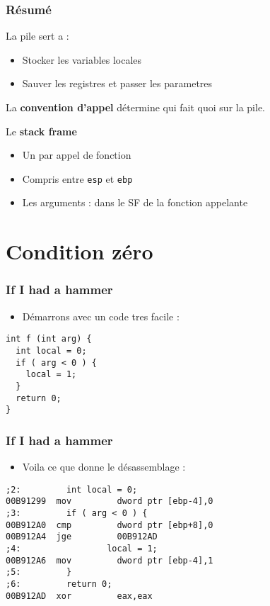 \documentclass{beamer}
\begin{document}
\begin{frame}[fragile]
\frametitle{Résumé}
La pile sert a :
\begin{itemize}
\item Stocker les variables locales
\item Sauver les registres et passer les parametres
\end{itemize}
La \textbf{convention d'appel} détermine qui fait quoi sur la pile.

Le \textbf{stack frame}
\begin{itemize}
\item Un par appel de fonction
\item Compris entre \texttt{esp} et \texttt{ebp}
\item Les arguments : dans le SF de la fonction appelante
\end{itemize}

\end{frame}

\section{Condition zéro}
\begin{frame}[fragile]
\frametitle{If I had a hammer}
\begin{itemize}
\item Démarrons avec un code tres facile :
\end{itemize}
\begin{lstlisting}
int f (int arg) {
  int local = 0;
  if ( arg < 0 ) {
    local = 1;
  }
  return 0;
}
\end{lstlisting}
\end{frame}

\begin{frame}[fragile]
\frametitle{If I had a hammer}
\begin{itemize}
\item Voila ce que donne le désassemblage : 
\end{itemize}
\begin{lstlisting}[language={[x86masm]Assembler}]
;2:         int local = 0;
00B91299  mov         dword ptr [ebp-4],0  
;3:         if ( arg < 0 ) {
00B912A0  cmp         dword ptr [ebp+8],0  
00B912A4  jge         00B912AD  
;4:                 local = 1;
00B912A6  mov         dword ptr [ebp-4],1  
;5:         }
;6:         return 0;
00B912AD  xor         eax,eax  
\end{lstlisting}
\end{frame}
\end{document}
